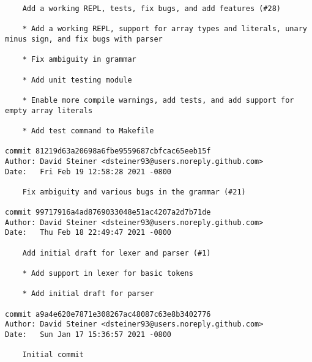 \documentclass{article}
\begin{document}
\begin{verbatim}
    Add a working REPL, tests, fix bugs, and add features (#28)
    
    * Add a working REPL, support for array types and literals, unary minus sign, and fix bugs with parser
    
    * Fix ambiguity in grammar
    
    * Add unit testing module
    
    * Enable more compile warnings, add tests, and add support for empty array literals
    
    * Add test command to Makefile

commit 81219d63a20698a6fbe9559687cbfcac65eeb15f
Author: David Steiner <dsteiner93@users.noreply.github.com>
Date:   Fri Feb 19 12:58:28 2021 -0800

    Fix ambiguity and various bugs in the grammar (#21)

commit 99717916a4ad8769033048e51ac4207a2d7b71de
Author: David Steiner <dsteiner93@users.noreply.github.com>
Date:   Thu Feb 18 22:49:47 2021 -0800

    Add initial draft for lexer and parser (#1)
    
    * Add support in lexer for basic tokens
    
    * Add initial draft for parser

commit a9a4e620e7871e308267ac48087c63e8b3402776
Author: David Steiner <dsteiner93@users.noreply.github.com>
Date:   Sun Jan 17 15:36:57 2021 -0800

    Initial commit
    
\end{verbatim}
\end{document}
